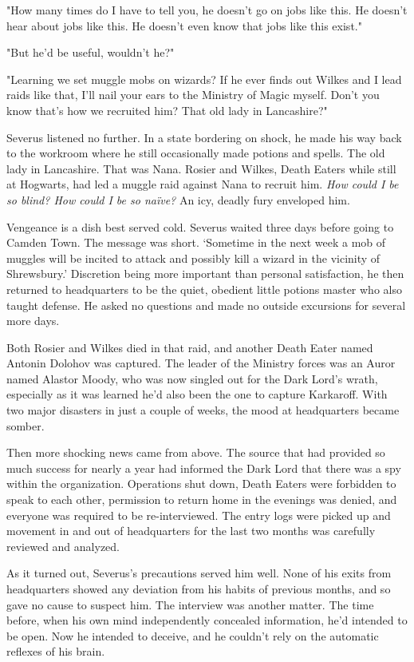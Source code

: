 "How many times do I have to tell you, he doesn't go on jobs like this. He doesn't hear about jobs like this. He doesn't even know that jobs like this exist."

"But he'd be useful, wouldn't he?"

"Learning we set muggle mobs on wizards? If he ever finds out Wilkes and I lead raids like that, I'll nail your ears to the Ministry of Magic myself. Don't you know that's how we recruited him? That old lady in Lancashire?"

Severus listened no further. In a state bordering on shock, he made his way back to the workroom where he still occasionally made potions and spells. The old lady in Lancashire. That was Nana. Rosier and Wilkes, Death Eaters while still at Hogwarts, had led a muggle raid against Nana to recruit him. \emph{How could I be so blind? How could I be so naïve?} An icy, deadly fury enveloped him.

Vengeance is a dish best served cold. Severus waited three days before going to Camden Town. The message was short. `Sometime in the next week a mob of muggles will be incited to attack and possibly kill a wizard in the vicinity of Shrewsbury.' Discretion being more important than personal satisfaction, he then returned to headquarters to be the quiet, obedient little potions master who also taught defense. He asked no questions and made no outside excursions for several more days.

Both Rosier and Wilkes died in that raid, and another Death Eater named Antonin Dolohov was captured. The leader of the Ministry forces was an Auror named Alastor Moody, who was now singled out for the Dark Lord's wrath, especially as it was learned he'd also been the one to capture Karkaroff. With two major disasters in just a couple of weeks, the mood at headquarters became somber.

Then more shocking news came from above. The source that had provided so much success for nearly a year had informed the Dark Lord that there was a spy within the organization. Operations shut down, Death Eaters were forbidden to speak to each other, permission to return home in the evenings was denied, and everyone was required to be re-interviewed. The entry logs were picked up and movement in and out of headquarters for the last two months was carefully reviewed and analyzed.

As it turned out, Severus's precautions served him well. None of his exits from headquarters showed any deviation from his habits of previous months, and so gave no cause to suspect him. The interview was another matter. The time before, when his own mind independently concealed information, he'd intended to be open. Now he intended to deceive, and he couldn't rely on the automatic reflexes of his brain.

